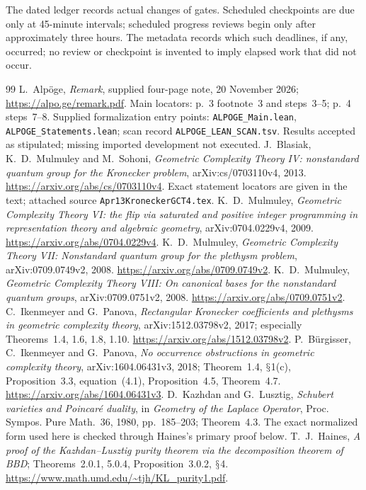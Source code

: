 \documentclass[11pt,a4paper]{article}
\renewcommand{\S}{\ensuremath{\mathsection}}
\theoremstyle{named}\newtheorem{finding}{Finding}[section]
\theoremstyle{definition}\newtheorem{definition}[finding]{Definition}
\theoremstyle{remark}\newtheorem{remark}[finding]{Remark}
\begin{document}
The dated ledger records actual changes of gates. Scheduled checkpoints are due only at 45-minute intervals; scheduled progress reviews begin only after approximately three hours. The metadata records which such deadlines, if any, occurred; no review or checkpoint is invented to imply elapsed work that did not occur.

\begin{thebibliography}{99}
 L.~Alp\"oge, \emph{Remark}, supplied four-page note, 20 November 2026; \url{https://alpo.ge/remark.pdf}. Main locators: p.~3 footnote~3 and steps~3--5; p.~4 steps~7--8. Supplied formalization entry points: \texttt{ALPOGE\_Main.lean}, \texttt{ALPOGE\_Statements.lean}; scan record \texttt{ALPOGE\_LEAN\_SCAN.tsv}. Results accepted as stipulated; missing imported development not executed.
 J.~Blasiak, K.~D.~Mulmuley and M.~Sohoni, \emph{Geometric Complexity Theory IV: nonstandard quantum group for the Kronecker problem}, arXiv:cs/0703110v4, 2013. \url{https://arxiv.org/abs/cs/0703110v4}. Exact statement locators are given in the text; attached source \texttt{Apr13KroneckerGCT4.tex}.
 K.~D.~Mulmuley, \emph{Geometric Complexity Theory VI: the flip via saturated and positive integer programming in representation theory and algebraic geometry}, arXiv:0704.0229v4, 2009. \url{https://arxiv.org/abs/0704.0229v4}.
 K.~D.~Mulmuley, \emph{Geometric Complexity Theory VII: Nonstandard quantum group for the plethysm problem}, arXiv:0709.0749v2, 2008. \url{https://arxiv.org/abs/0709.0749v2}.
 K.~D.~Mulmuley, \emph{Geometric Complexity Theory VIII: On canonical bases for the nonstandard quantum groups}, arXiv:0709.0751v2, 2008. \url{https://arxiv.org/abs/0709.0751v2}.
 C.~Ikenmeyer and G.~Panova, \emph{Rectangular Kronecker coefficients and plethysms in geometric complexity theory}, arXiv:1512.03798v2, 2017; especially Theorems~1.4, 1.6, 1.8, 1.10. \url{https://arxiv.org/abs/1512.03798v2}.
 P.~B\"urgisser, C.~Ikenmeyer and G.~Panova, \emph{No occurrence obstructions in geometric complexity theory}, arXiv:1604.06431v3, 2018; Theorem~1.4, \S1(c), Proposition~3.3, equation~(4.1), Proposition~4.5, Theorem~4.7. \url{https://arxiv.org/abs/1604.06431v3}.
 D.~Kazhdan and G.~Lusztig, \emph{Schubert varieties and Poincar\'e duality}, in \emph{Geometry of the Laplace Operator}, Proc. Sympos. Pure Math.~36, 1980, pp.~185--203; Theorem~4.3. The exact normalized form used here is checked through Haines's primary proof below.
 T.~J.~Haines, \emph{A proof of the Kazhdan--Lusztig purity theorem via the decomposition theorem of BBD}; Theorems~2.0.1, 5.0.4, Proposition~3.0.2, \S4. \url{https://www.math.umd.edu/~tjh/KL_purity1.pdf}.

\end{thebibliography}
\end{document}
